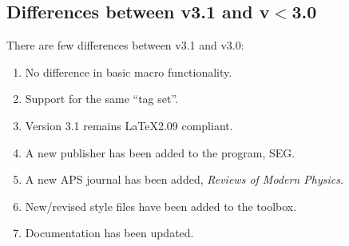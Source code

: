\subsection{Differences between \REVTeX{} v3.1 and \REVTeX{} v$<$3.0}
\label{sec:2to3}

There are few differences between \REVTeX{} v3.1 and v3.0:
\begin{enumerate}
\item No difference in basic macro functionality.
\item Support for the same ``tag set''. 
\item Version 3.1 remains \LaTeX2.09 compliant.
\item A new publisher has been added to the program, SEG.
\item A new APS journal has been added, {\it Reviews of Modern
Physics}. 
\item New/revised style files have been added to the toolbox. 
\item Documentation has been updated. 
\end{enumerate}

